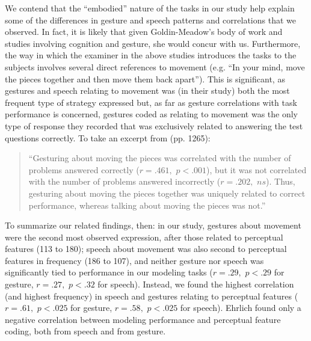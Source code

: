 We contend that the ``embodied'' nature of the tasks in our study help explain
some of the differences in gesture and speech patterns and correlations that we
observed. In fact, it is likely that given Goldin-Meadow's body of work and
studies involving cognition and gesture, she would concur with us. Furthermore,
the way in which the examiner in the above studies introduces the tasks to the
subjects involves several direct references to movement (e.g. ``In your mind,
move the pieces together and then move them back apart''). This is significant,
as gestures and speech relating to movement was (in their study) both the most
frequent type of strategy expressed but, as far as gesture correlations with
task performance is concerned, gestures coded as relating to movement was the
only type of response they recorded that was exclusively related to answering
the test questions correctly. To take an excerpt from
\cite{ehrlich2006importance} (pp. 1265):
\begin{quote}
``Gesturing about moving the pieces was
correlated with the number of problems answered correctly ($r = .461,$ $p <
.001$), but it was not correlated with the number of problems answered
incorrectly ($r = .202,$ $ns$). Thus, gesturing about moving the pieces together
was uniquely related to correct performance, whereas talking about moving the
pieces was not.''
\end{quote}  

To summarize our related findings, then: in our study, gestures about movement
were the second most observed expression, after those related to perceptual
features (113 to 180); speech about movement was also second to perceptual
features in frequency (186 to 107), and neither gesture nor speech was
significantly tied to performance in our modeling tasks ($r = .29,$ $p < .29$
for gesture, $r= .27,$ $p < .32$ for speech). Instead, we found the highest
correlation (and highest frequency) in speech and gestures relating to
perceptual features ($r = .61,$ $p < .025$ for gesture, $r = .58,$ $p < .025$
for speech). Ehrlich found only a negative correlation between modeling
performance and perceptual feature coding, both from speech and from gesture.

